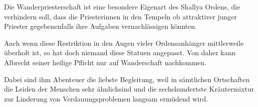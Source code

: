 
Die Wanderpriesterschaft ist eine besondere Eigenart des Shallya Ordens, die verhindern soll, dass die Priesterinnen in den Tempeln ob attraktiver junger Priester gegebenenfalls ihre Aufgaben vernachlässigen könnten.  

Auch wenn diese Restriktion in den Augen vieler Ordensanhänger mittlerweile überholt ist, so hat doch niemand diese Statuen angepasst. Von daher kann Albrecht seiner heilige Pflicht nur auf Wanderschaft nachkommen.  

Dabei sind ihm Abenteuer die liebste Begleitung, weil in sämtlichen Ortschaften die Leiden der Menschen sehr ähnlichsind  und die sechshundertste Kräutermixtur zur Linderung von Verdauungsproblemen langsam ermüdend wird.
